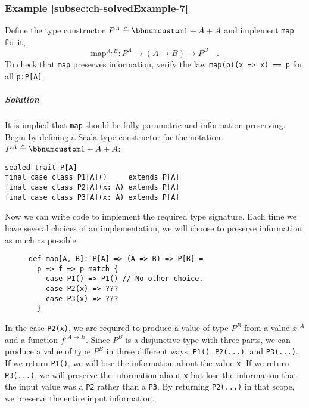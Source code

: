 \subsubsection{Example \label{subsec:ch-solvedExample-7}\ref{subsec:ch-solvedExample-7}}

Define the type constructor $P^{A}\triangleq\bbnum 1+A+A$ and implement
\lstinline!map! for it,
\[
\text{map}^{A,B}:P^{A}\rightarrow(A\rightarrow B)\rightarrow P^{B}\quad.
\]
To check that \lstinline!map! preserves information, verify the law
\lstinline!map(p)(x => x) == p! for all \lstinline!p:P[A]!.

\subparagraph{Solution}

It is implied that \lstinline!map! should be fully parametric and
information-preserving. Begin by defining a Scala type constructor
for the notation $P^{A}\triangleq\bbnum 1+A+A$:
\begin{lstlisting}
sealed trait P[A]
final case class P1[A]()     extends P[A]
final case class P2[A](x: A) extends P[A]
final case class P3[A](x: A) extends P[A]
\end{lstlisting}
Now we can write code to implement the required type signature. Each
time we have several choices of an implementation, we will choose
to preserve information as much as possible.

\begin{wrapfigure}{l}{0.45\columnwidth}%
\vspace{0.24\baselineskip}

\begin{lstlisting}
def map[A, B]: P[A] => (A => B) => P[B] =
  p => f => p match {
    case P1() => P1() // No other choice.
    case P2(x) => ???
    case P3(x) => ???
  }
\end{lstlisting}
\vspace{-0.9\baselineskip}
\end{wrapfigure}%

\noindent In the case \lstinline!P2(x)!, we are required to produce
a value of type $P^{B}$ from a value $x^{:A}$ and a function $f^{:A\rightarrow B}$.
Since $P^{B}$ is a disjunctive type with three parts, we can produce
a value of type $P^{B}$ in three different ways: \lstinline!P1()!,
\lstinline!P2(...)!, and \lstinline!P3(...)!. If we return \lstinline!P1()!,
we will lose the information about the value \lstinline!x!. If we
return \lstinline!P3(...)!, we will preserve the information about
\lstinline!x! but lose the information that
the input value was a \lstinline!P2! rather than a \lstinline!P3!.
By returning \lstinline!P2(...)! in that scope, we preserve the entire
input information. 

